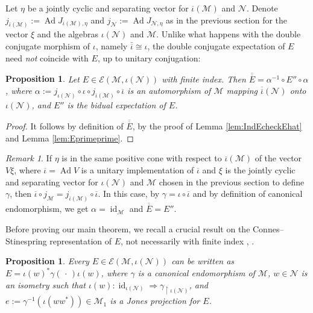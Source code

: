\documentclass[11pt,a4paper]{article}
\makeatletter
\newcommand{\iotabar}{{\overline{\iota}}}
\newcommand{\Ebar}{{\overline{E}}}
\newcommand{\slot}{{\,\cdot \,}}
\newcommand{\E}{\mathcal{E}}
\newcommand{\M}{\mathcal{M}}
\newcommand{\N}{\mathcal{N}}
\DeclareMathOperator{\Ad}{Ad}
\DeclareMathOperator{\id}{id}
\DeclareRobustCommand{\Prop}{Prop.\@\xspace}
\DeclareRobustCommand{\Lem}{Lem.\@\xspace}
\theoremstyle{plain}
\newtheorem{prop}[thm]{Proposition}
\theoremstyle{definition}
\theoremstyle{remark}
\newtheorem{rmk}[thm]{Remark}
\numberwithin{equation}{section}%
\makeatother
\begin{document}
Let $\eta$ be a jointly cyclic and separating vector for $\iotabar(\M)$ and $\N$. Denote $j_{\iotabar(\M)} := \Ad{J_{\iotabar(\M),\eta}}$ and $j_{\N} := \Ad{J_{\N,\eta}}$ as in the previous section for the vector $\xi$ and the algebras $\iota(\N)$ and $\M$. Unlike what happens with the double conjugate morphism of $\iota$, namely $\bar\iotabar \cong \iota$, the double conjugate expectation of $E$ need \emph{not} coincide with $E$, up to unitary conjugation:

\begin{prop}\label{prop:Ebarbar}
Let $E\in \E(\M,\iota(\N))$ with finite index. Then $\overline{\Ebar} = \alpha^{-1} \circ E'' \circ \alpha$, where $\alpha := j_{\iota(\N)} \circ \iota \circ j_{\iotabar(\M)} \circ \iotabar$ is an automorphism of $\M$ mapping $\overline{\iotabar}(\N)$ onto $\iota(\N)$, and $E''$ is the bidual expectation of $E$.
\end{prop}

\begin{proof}
It follows by definition of $\overline{\Ebar}$, by the proof of Lemma \ref{lem:IndEcheckEhat} and Lemma \ref{lem:Eprimeprime}.
\end{proof}

\begin{rmk}
If $\eta$ is in the same positive cone with respect to $\iotabar(\M)$ of the vector $V\xi$, where $\iotabar = \Ad V$ is a unitary implementation of $\iotabar$ and $\xi$ is the jointly cyclic and separating vector for $\iota(\N)$ and $\M$ chosen in the previous section to define $\gamma$, then $\iotabar \circ j_{\M} = j_{\iotabar(\M)} \circ \iotabar$. In this case, by $\gamma = \iota\circ \iotabar$ and by definition of canonical endomorphism, we get $\alpha = \id_\M$ and $\overline{\Ebar} = E''$. 
\end{rmk}

Before proving our main theorem, we recall a crucial result on the Connes--Stinespring representation of $E$, not necessarily with finite index \cite[\Prop 5.1]{Lon89}, \cite[\Lem 3.3]{FiIs95}. 

\begin{prop}\label{prop:ConnesStineE}
Every $E\in\E(\M,\iota(\N))$ can be written as $E = \iota(w)^*\gamma(\slot)\iota(w)$, where $\gamma$ is a canonical endomorphism of $\M$, $w\in\N$ is an isometry such that $\iota(w):\id_{\iota(\N)}\Rightarrow\gamma_{\restriction\iota(\N)}$, and $e := \gamma^{-1}(\iota(ww^*)) \in \M_1$ is a Jones projection for $E$.
\end{prop}
\end{document}
